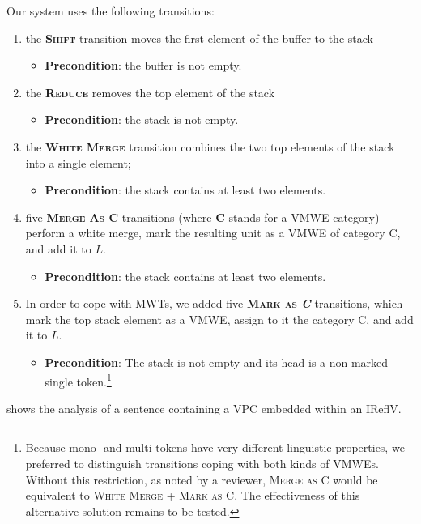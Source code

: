 \documentclass[output=paper,modfonts]{langscibook}
\begin{document}
Our system uses the following transitions: 
\begin{enumerate}
\item the \textsc{\textbf{Shift}} transition moves the first element of the buffer to the stack
\begin{itemize}
\item[] \textbf{Precondition}: the buffer is not empty.
\end{itemize}
\largerpage
\item the \textsc{\textbf{Reduce}} removes the top element of the stack
\begin{itemize}
\item[] \textbf{Precondition}: the stack is not empty.
\end{itemize}
\item the \textbf{\textsc{White Merge}} transition combines the two top elements of the stack into a single element;  
\begin{itemize}
\item[] \textbf{Precondition}: the stack contains at least two elements.
\end{itemize}
\item five \textsc{\textbf{Merge As \textbf{C}}} transitions (where \textbf{C} stands for a VMWE category) perform a white merge, mark the resulting unit as a VMWE of category \textsc{C}, and add it to $L$.
\begin{itemize}
\item[] \textbf{Precondition}: the stack contains at least two elements.
\end{itemize}
\item In order to cope with MWTs, we added five \textsc{\textbf{Mark as \emph{C}}} transitions, which mark the top stack element as a VMWE, assign to it the category \textsc{C}, and add it to $L$.
\begin{itemize}
\item[] \textbf{Precondition}: The stack is not empty and its head is a non-marked single token.\footnote{Because mono- and multi-tokens have very different linguistic properties, we preferred to distinguish transitions coping with both kinds of VMWEs. Without this restriction, as noted by a reviewer, \textsc{Merge as C} would be equivalent to \textsc{White Merge + Mark as C}. The effectiveness of this alternative solution remains to be tested.}
\end{itemize}
\end{enumerate}
 shows the analysis of a  sentence containing a  VPC embedded within an IReflV.
\end{document}
